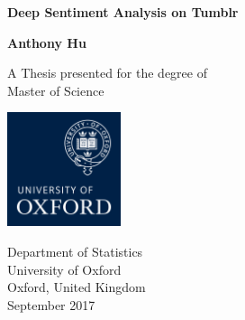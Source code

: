 
\setcounter{page}{1}

\newpage

\thispagestyle{empty}
\begin{center}
  \vspace*{1cm}
  {\Huge \bf Deep Sentiment Analysis on Tumblr}

  \vspace*{2cm}
  {\LARGE\bf Anthony Hu}

  \vfill

  {\Large A Thesis presented for the degree of\\
         [1mm] Master of Science}
  \vspace*{0.9cm}
  
   \begin{center}
   \includegraphics[width=0.25\textwidth]{Images/ox_logo.png}
   \end{center}

  {\large
          Department of Statistics\\
          [-3mm] University of Oxford\\
          [-3mm] Oxford, United Kingdom\\
          [1mm]  September 2017}

\end{center}

